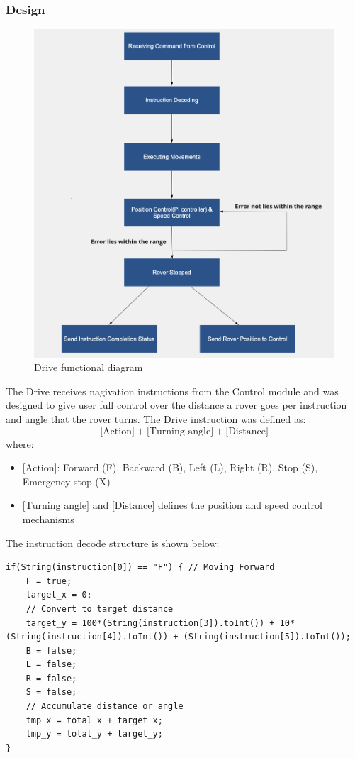 \documentclass[11pt, a4paper]{article}
\begin{document}
\subsubsection{Design}

\begin{figure} [h!]
    \centering
    \includegraphics[scale=0.3]{Drive_functional.png}
    \caption{Drive functional diagram}
\end{figure}

The Drive receives nagivation instructions from the Control module and was designed to give user full control over the distance a rover goes per instruction and angle that the rover turns. The Drive instruction was defined as:
$$
\text{[Action]} + \text{[Turning angle]} + \text{[Distance]}
$$
where:
\begin{itemize}
    \item $\text{[Action]}$: Forward (F), Backward (B), Left (L), Right (R), Stop (S), Emergency stop (X)
    \item $\text{[Turning angle]}$ and $\text{[Distance]}$ defines the position and speed control mechanisms
\end{itemize}

The instruction decode structure is shown below:
\begin{lstlisting}
if(String(instruction[0]) == "F") { // Moving Forward
    F = true;
    target_x = 0;
    // Convert to target distance
    target_y = 100*(String(instruction[3]).toInt()) + 10*(String(instruction[4]).toInt()) + (String(instruction[5]).toInt()); 
    B = false;
    L = false;
    R = false;
    S = false;
    // Accumulate distance or angle
    tmp_x = total_x + target_x;
    tmp_y = total_y + target_y;
}
\end{lstlisting}
\end{document}
